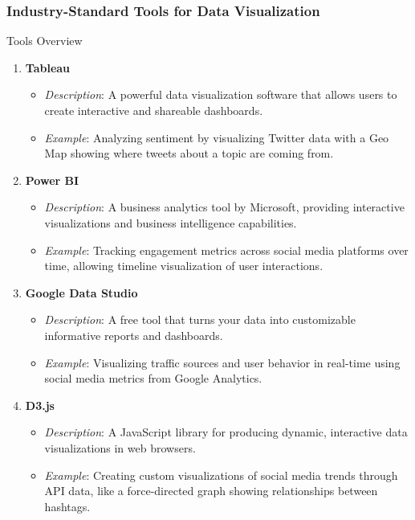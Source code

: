 \documentclass{beamer}
\begin{document}
\begin{frame}[fragile]
    \frametitle{Industry-Standard Tools for Data Visualization}
    \begin{block}{Tools Overview}
        \begin{enumerate}
            \item \textbf{Tableau}
                \begin{itemize}
                    \item \textit{Description}: A powerful data visualization software that allows users to create interactive and shareable dashboards.
                    \item \textit{Example}: Analyzing sentiment by visualizing Twitter data with a Geo Map showing where tweets about a topic are coming from.
                \end{itemize}
            \item \textbf{Power BI}
                \begin{itemize}
                    \item \textit{Description}: A business analytics tool by Microsoft, providing interactive visualizations and business intelligence capabilities.
                    \item \textit{Example}: Tracking engagement metrics across social media platforms over time, allowing timeline visualization of user interactions.
                \end{itemize}
            \item \textbf{Google Data Studio}
                \begin{itemize}
                    \item \textit{Description}: A free tool that turns your data into customizable informative reports and dashboards.
                    \item \textit{Example}: Visualizing traffic sources and user behavior in real-time using social media metrics from Google Analytics.
                \end{itemize}
            \item \textbf{D3.js}
                \begin{itemize}
                    \item \textit{Description}: A JavaScript library for producing dynamic, interactive data visualizations in web browsers.
                    \item \textit{Example}: Creating custom visualizations of social media trends through API data, like a force-directed graph showing relationships between hashtags.
                \end{itemize}
        \end{enumerate}
    \end{block}
\end{frame}
\end{document}
